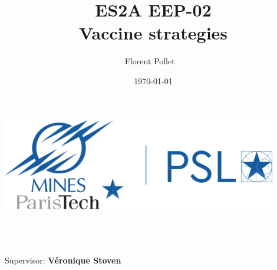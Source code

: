 \title{\Large ES2A EEP-02  \\[0.5cm]
        \bf\Large Vaccine strategies}
\author{\large Florent Pollet \ \\}
\date{\large\today}

\makeatletter
    \begin{titlepage}
        \begin{center}
	   { \includegraphics[width=12cm]{imgs/mp_logo.png}}
	   {\ \\ \ \\}
        \vbox{}\vspace{2cm}
            {\@title }\\[1cm] 
            {\@author}

            {\large \ \\ Supervisor: \bf Véronique Stoven\\ \ \\}
            {\@date\\}

        \end{center}

    \end{titlepage}

        
    \begin{remerciements}
        
    \end{remerciements}


    \tableofcontents


    \newpage

    \makeatother